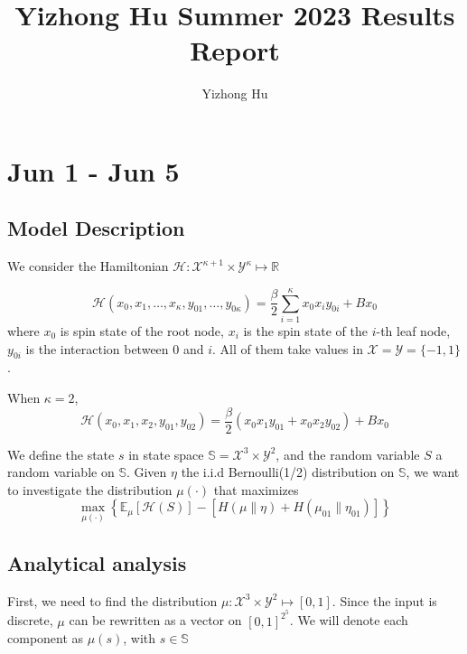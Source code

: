 \documentclass[12pt]{article}
\numberwithin{equation}{section}
\begin{document}
\title{Yizhong Hu Summer 2023 Results Report}
\author{Yizhong Hu}
\maketitle

\section{Jun 1 - Jun 5}

\subsection{Model Description}

We consider the Hamiltonian $\mathcal{H}: \mathcal{X}^{\kappa + 1} \times \mathcal{Y}^{\kappa} \mapsto \mathbb{R}$

\begin{equation*}
    \mathcal{H}(x_0, x_1, \ldots, x_\kappa, y_{01}, \ldots, y_{0\kappa} ) = \frac{\beta}{2}\sum_{i=1}^\kappa x_0x_iy_{0i} + Bx_0
\end{equation*}
where $x_0$ is spin state of the root node, $x_i$ is the spin state of the $i$-th leaf node, $y_{0i}$ is the interaction between
$0$ and $i$. All of them take values in $\mathcal{X} = \mathcal{Y} = \{-1, 1\}$.

When $\kappa=2$,
\begin{equation*}
    \mathcal{H}(x_0, x_1, x_2, y_{01}, y_{02} ) = \frac{\beta}{2}(x_0x_1y_{01} + x_0x_2y_{02}) + Bx_0
\end{equation*}

We define the state $s$ in state space $\mathbb{S} = \mathcal{X}^3 \times \mathcal{Y}^2$, and the random variable $S$ a random variable
on $\mathbb{S}$. Given $\eta$ the i.i.d Bernoulli(1/2) distribution on $\mathbb{S}$, we want to investigate the distribution $\mu(\cdot)$ that maximizes
\begin{equation*}
    \max_{\mu(\cdot)} \left\{\mathbb{E}_\mu[\mathcal{H}(S)] - \left[H(\mu \| \eta) + H(\mu_{01}\|\eta_{01} )\right]\right\}
\end{equation*}

\subsection{Analytical analysis}

First, we need to find the distribution $\mu: \mathcal{X}^3 \times \mathcal{Y}^2 \mapsto [0, 1]$. Since the input is discrete,
$\mu$ can be rewritten as a vector on $[0, 1]^{2^5}$. We will denote each component as $\mu(s)$, with $s\in \mathbb{S}$
\end{document}

